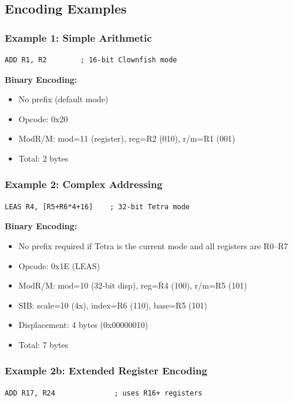 \documentclass[11pt]{article}
\begin{document}
\subsection{Encoding Examples}

\subsubsection{Example 1: Simple Arithmetic}

\begin{lstlisting}
ADD R1, R2        ; 16-bit Clownfish mode
\end{lstlisting}

\textbf{Binary Encoding:}
\begin{itemize}
    \item No prefix (default mode)
    \item Opcode: 0x20
    \item ModR/M: mod=11 (register), reg=R2 (010), r/m=R1 (001)
    \item Total: 2 bytes
\end{itemize}

\subsubsection{Example 2: Complex Addressing}

\begin{lstlisting}
LEAS R4, [R5+R6*4+16]    ; 32-bit Tetra mode
\end{lstlisting}

\textbf{Binary Encoding:}
\begin{itemize}
    \item No prefix required if Tetra is the current mode and all registers are R0--R7
    \item Opcode: 0x1E (LEAS)
    \item ModR/M: mod=10 (32-bit disp), reg=R4 (100), r/m=R5 (101)
    \item SIB: scale=10 (4x), index=R6 (110), base=R5 (101)
    \item Displacement: 4 bytes (0x00000010)
    \item Total: 7 bytes
\end{itemize}

\subsubsection{Example 2b: Extended Register Encoding}

\begin{lstlisting}
ADD R17, R24              ; uses R16+ registers
\end{lstlisting}
\end{document}

